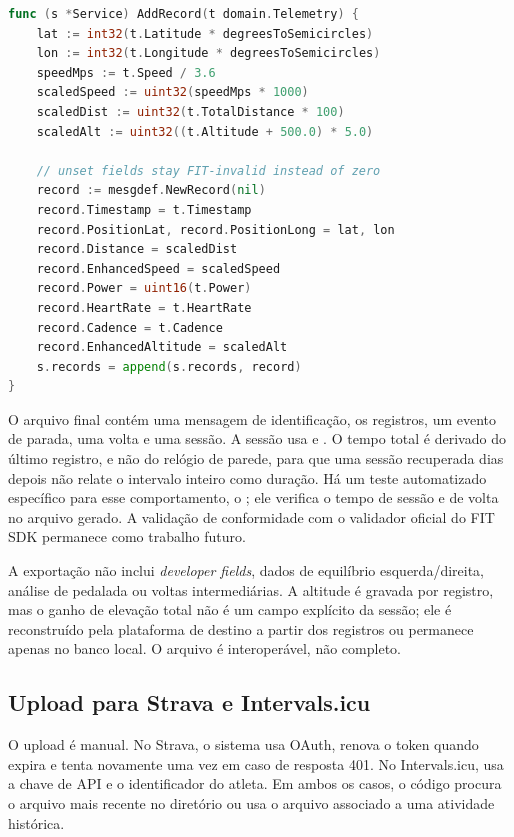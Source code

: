 \begin{lstlisting}[language=Go, float=htbp, caption={Conversão de telemetria para um registro FIT}, label={lst:fit}]
func (s *Service) AddRecord(t domain.Telemetry) {
    lat := int32(t.Latitude * degreesToSemicircles)
    lon := int32(t.Longitude * degreesToSemicircles)
    speedMps := t.Speed / 3.6
    scaledSpeed := uint32(speedMps * 1000)
    scaledDist := uint32(t.TotalDistance * 100)
    scaledAlt := uint32((t.Altitude + 500.0) * 5.0)

    // unset fields stay FIT-invalid instead of zero
    record := mesgdef.NewRecord(nil)
    record.Timestamp = t.Timestamp
    record.PositionLat, record.PositionLong = lat, lon
    record.Distance = scaledDist
    record.EnhancedSpeed = scaledSpeed
    record.Power = uint16(t.Power)
    record.HeartRate = t.HeartRate
    record.Cadence = t.Cadence
    record.EnhancedAltitude = scaledAlt
    s.records = append(s.records, record)
}
\end{lstlisting}

O arquivo final contém uma mensagem de identificação, os registros, um evento de
parada, uma volta e uma sessão. A sessão usa  e
. O tempo total é derivado do último registro, e
não do relógio de parede, para que uma sessão recuperada dias depois não
relate o intervalo inteiro como duração. Há um teste automatizado específico
para esse comportamento, o
; ele verifica o tempo de sessão e
de volta no arquivo gerado. A validação de conformidade com o validador oficial
do FIT SDK permanece como trabalho futuro.

A exportação não inclui \textit{developer fields}, dados de equilíbrio
esquerda/direita, análise de pedalada ou voltas intermediárias. A altitude é
gravada por registro, mas o ganho de elevação total não é um campo explícito da
sessão; ele é reconstruído pela plataforma de destino a partir dos registros ou
permanece apenas no banco local. O arquivo é interoperável, não completo.

\subsection{Upload para Strava e Intervals.icu}
\label{sec:implementacao-upload}

O upload é manual. No Strava, o sistema usa OAuth, renova o token quando expira
e tenta novamente uma vez em caso de resposta 401. No Intervals.icu, usa a
chave de API e o identificador do atleta. Em ambos os casos, o código procura o
arquivo  mais recente no diretório  ou usa o arquivo
associado a uma atividade histórica.

